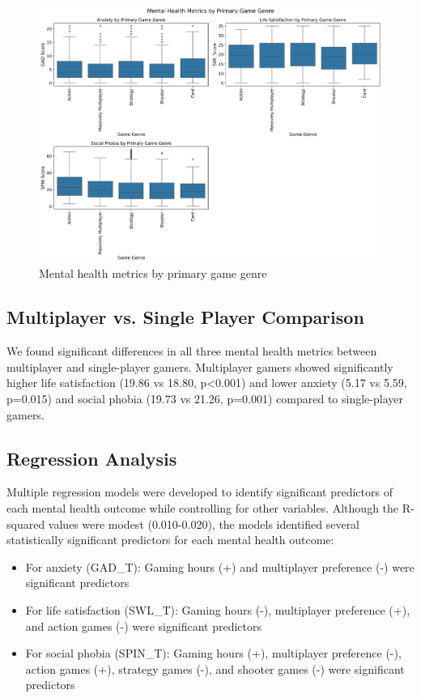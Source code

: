 \documentclass[12pt]{article}
\begin{document}
\begin{figure}[H]
\centering
\includegraphics[width=\textwidth]{mental_health_by_primary_genre.png}
\caption{Mental health metrics by primary game genre}
\label{fig:game_genres}
\end{figure}

\subsection{Multiplayer vs. Single Player Comparison}

We found significant differences in all three mental health metrics between multiplayer and single-player gamers. Multiplayer gamers showed significantly higher life satisfaction (19.86 vs 18.80, p\textless0.001) and lower anxiety (5.17 vs 5.59, p=0.015) and social phobia (19.73 vs 21.26, p=0.001) compared to single-player gamers.

\subsection{Regression Analysis}

Multiple regression models were developed to identify significant predictors of each mental health outcome while controlling for other variables. Although the R-squared values were modest (0.010-0.020), the models identified several statistically significant predictors for each mental health outcome:

\begin{itemize}
    \item For anxiety (GAD\_T): Gaming hours (+) and multiplayer preference (-) were significant predictors
    \item For life satisfaction (SWL\_T): Gaming hours (-), multiplayer preference (+), and action games (-) were significant predictors
    \item For social phobia (SPIN\_T): Gaming hours (+), multiplayer preference (-), action games (+), strategy games (-), and shooter games (-) were significant predictors
\end{itemize}
\end{document}
